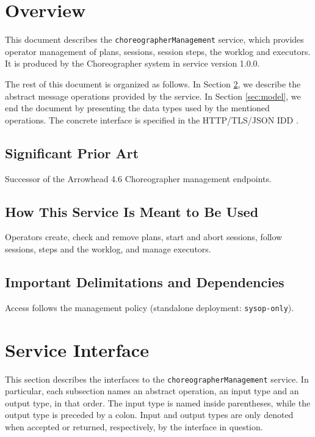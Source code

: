 \documentclass[a4paper]{arrowhead}
\begin{document}
\section{Overview}
\label{sec:overview}

This document describes the \texttt{choreographer\allowbreak{}Management} service, which provides operator management of plans, sessions, session steps, the worklog and executors.
It is produced by the Choreographer system \cite{cho-sysd} in service version 1.0.0.

The rest of this document is organized as follows.
In Section \ref{sec:operations}, we describe the abstract message operations provided by the service.
In Section \ref{sec:model}, we end the document by presenting the data types used by the mentioned operations.
The concrete interface is specified in the HTTP/TLS/JSON IDD \cite{cho-choreographerManagement-http-idd}.

\subsection{Significant Prior Art}

Successor of the Arrowhead 4.6 Choreographer management endpoints.

\subsection{How This Service Is Meant to Be Used}

Operators create, check and remove plans, start and abort sessions, follow sessions, steps and the worklog, and manage executors.

\subsection{Important Delimitations and Dependencies}
\label{sec:delimitations}

Access follows the management policy (standalone deployment: \texttt{sysop-\allowbreak{}only}).

\newpage

\section{Service Interface}
\label{sec:operations}

This section describes the interfaces to the \texttt{choreographer\allowbreak{}Management} service.
In particular, each subsection names an abstract operation, an input type and an output type, in that order.
The input type is named inside parentheses, while the output type is preceded by a colon.
Input and output types are only denoted when accepted or returned, respectively, by the interface in question.
\end{document}
